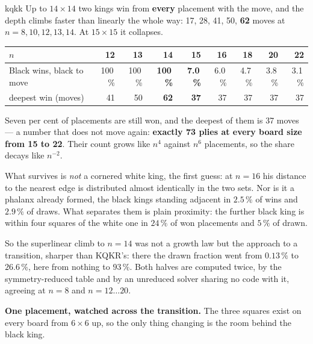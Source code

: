 \documentclass[10pt]{article}
\begin{document}
\begin{result}[title={The hunt has a critical board size, and it is between 14 and 15}]{kqkk}
Up to $14\times14$ two kings win from \textbf{every} placement with the move,
and the depth climbs faster than linearly the whole way: 17, 28, 41, 50,
\textbf{62} moves at $n=8,10,12,13,14$. At $15\times15$ it collapses.

\smallskip
\begin{center}\small
\begin{tabular}{@{}lrrrrrrrr@{}}
\toprule
$n$ & 12 & 13 & \textbf{14} & \textbf{15} & 16 & 18 & 20 & 22 \\
\midrule
Black wins, black to move & 100\,\% & 100\,\% & \textbf{100\,\%} & \textbf{7.0\,\%}
  & 6.0\,\% & 4.7\,\% & 3.8\,\% & 3.1\,\% \\
deepest win (moves)       & 41 & 50 & \textbf{62} & \textbf{37} & 37 & 37 & 37 & 37 \\
\bottomrule
\end{tabular}
\end{center}

\smallskip
Seven per cent of placements are still won, and the deepest of them is 37
moves --- a number that does not move again: \textbf{exactly 73 plies at every
board size from 15 to 22}. Their count grows like $n^4$ against $n^6$
placements, so the share decays like $n^{-2}$.

\smallskip
What survives is \emph{not} a cornered white king, the first guess: at $n=16$
his distance to the nearest edge is distributed almost identically in the two
sets. Nor is it a phalanx already formed, the black kings standing adjacent in
$2.5\,\%$ of wins and $2.9\,\%$ of draws. What separates them is plain
proximity: the further black king is within four squares of the white one in
$24\,\%$ of won placements and $5\,\%$ of drawn.
\label{sub:cap-hunt-length}
\end{result}

\noindent
So the superlinear climb to $n=14$ was not a growth law but the approach to a
transition, sharper than KQKR's: there the drawn fraction went from $0.13\,\%$
to $26.6\,\%$, here from nothing to $93\,\%$. Both halves are computed twice,
by the symmetry-reduced table and by an unreduced solver sharing no code with
it, agreeing at $n=8$ and $n=12\ldots20$.

\medskip
\noindent
\textbf{One placement, watched across the transition.} The three squares exist
on every board from $6\times6$ up, so the only thing changing is the room
behind the black king.
\end{document}
